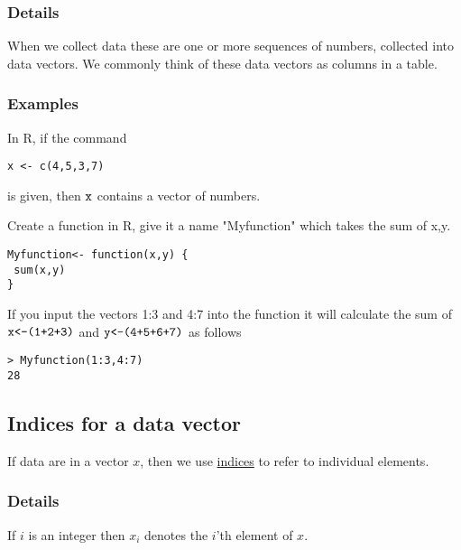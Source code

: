 \documentclass[12pt,a4paper]{article}
\theoremstyle{regla}
\theoremstyle{remark}
\theoremstyle{definition}
\theoremstyle{nonumberbreak}
\begin{document}
\subsubsection{Details}
When we collect data these are one or more sequences of numbers, collected into data vectors. We commonly think of these data vectors as columns in a table.

\subsubsection{Examples}
\begin{xmpl}
In R, if the command

\begin{lstlisting}
x <- c(4,5,3,7)
\end{lstlisting}

is given, then $\verb1x1$ contains  a vector of numbers.
\end{xmpl}
\begin{xmpl}
Create a function in R, give it a name "Myfunction" which takes the sum of x,y.

\begin{lstlisting}
Myfunction<- function(x,y) {
 sum(x,y)
}
\end{lstlisting}

If you input the vectors 1:3 and 4:7 into the function it will calculate the sum of $\verb|x<-(1+2+3)|$ and $\verb|y<-(4+5+6+7)|$ as follows
\begin{lstlisting}
> Myfunction(1:3,4:7)
28
\end{lstlisting}
\end{xmpl}

\subsection{Indices for a data vector}
\begin{fbox}
\begin{minipage}{0.97\textwidth}
If data are in a vector $x$, then we use \underline{indices} to refer to individual elements.
\end{minipage}
\end{fbox}
\subsubsection{Details}
If $i$ is an integer then $x_i$ denotes the $i$'th element of $x$. \\
\end{document}
